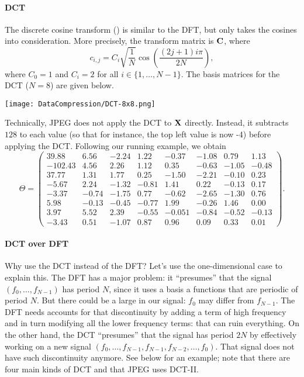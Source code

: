 \documentclass[a4paper, 11pt, openany]{book}
\begin{document}
\paragraph{DCT}
The discrete cosine transform () is similar to the DFT, but only takes the cosines into consideration. More precisely, the transform matrix is ${\bf C}$, where
\[
    c_{i,j} = C_i \sqrt{ \frac{1}{N} } \cos \left( \frac{(2j+1)i \pi}{2 N} \right),
\]
where $C_0 = 1$ and $C_i = 2$ for all $i \in \{1, \dots, N-1\}$. The basis matrices for the DCT ($N=8$) are given below.

\begin{center}
\texttt{[image: DataCompression/DCT-8x8.png]}
\end{center}

Technically, JPEG does not apply the DCT to ${\bf X}$ directly. Instead, it subtracts $128$ to each value (so that for instance, the top left value is now -4) before applying the DCT. Following our running example, we obtain
\[
    \Theta = \begin{pmatrix}
    39.88 & 6.56 & -2.24 & 1.22 & -0.37 & -1.08 & 0.79 & 1.13\\
    -102.43 & 4.56 & 2.26 & 1.12 & 0.35 & -0.63 & -1.05 & -0.48\\
    37.77 & 1.31 & 1.77 & 0.25 & -1.50 & -2.21 & -0.10 & 0.23\\
    -5.67 & 2.24 & -1.32 & -0.81 & 1.41 & 0.22 & -0.13 & 0.17\\
    -3.37 & -0.74 & -1.75 & 0.77 & -0.62 & -2.65 & -1.30 & 0.76\\
    5.98 & -0.13 & -0.45 & -0.77 & 1.99 & -0.26 & 1.46 & 0.00\\
    3.97 & 5.52 & 2.39 & -0.55 & -0.051 & -0.84 & -0.52 & -0.13\\
    -3.43 & 0.51 & -1.07 & 0.87 & 0.96 & 0.09 & 0.33 & 0.01
    \end{pmatrix}.
\]



\paragraph{DCT over DFT} Why use the DCT instead of the DFT? Let's use the one-dimensional case to explain this. The DFT has a major problem: it ``presumes'' that the signal $(f_0, \dots, f_{N-1})$ has period $N$, since it uses a basis a functions that are periodic of period $N$. But there could be a large  in our signal: $f_0$ may differ from $f_{N-1}$. The DFT needs accounts for that discontinuity by adding a term of high frequency and in turn modifying all the lower frequency terms: that can ruin everything. On the other hand, the DCT ``presumes'' that the signal has period $2N$ by effectively working on a new signal $(f_0, \dots, f_{N-1}, f_{N-1}, f_{N-2}, \dots, f_0)$. That signal does not have such discontinuity anymore. See below for an example; note that there are four main kinds of DCT and that JPEG uses DCT-II.
\end{document}
